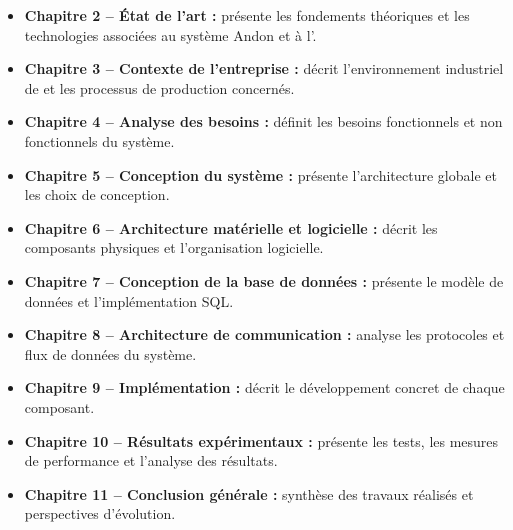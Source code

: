 \begin{itemize}
    \item \textbf{Chapitre 2 -- \'Etat de l'art :} pr\'esente les fondements th\'eoriques et les technologies associ\'ees au syst\`eme Andon et \`a l'\iiot.
    \item \textbf{Chapitre 3 -- Contexte de l'entreprise :} d\'ecrit l'environnement industriel de \sews et les processus de production concern\'es.
    \item \textbf{Chapitre 4 -- Analyse des besoins :} d\'efinit les besoins fonctionnels et non fonctionnels du syst\`eme.
    \item \textbf{Chapitre 5 -- Conception du syst\`eme :} pr\'esente l'architecture globale et les choix de conception.
    \item \textbf{Chapitre 6 -- Architecture mat\'erielle et logicielle :} d\'ecrit les composants physiques et l'organisation logicielle.
    \item \textbf{Chapitre 7 -- Conception de la base de donn\'ees :} pr\'esente le mod\`ele de donn\'ees et l'impl\'ementation SQL.
    \item \textbf{Chapitre 8 -- Architecture de communication :} analyse les protocoles et flux de donn\'ees du syst\`eme.
    \item \textbf{Chapitre 9 -- Impl\'ementation :} d\'ecrit le d\'eveloppement concret de chaque composant.
    \item \textbf{Chapitre 10 -- R\'esultats exp\'erimentaux :} pr\'esente les tests, les mesures de performance et l'analyse des r\'esultats.
    \item \textbf{Chapitre 11 -- Conclusion g\'en\'erale :} synth\`ese des travaux r\'ealis\'es et perspectives d'\'evolution.
\end{itemize}
